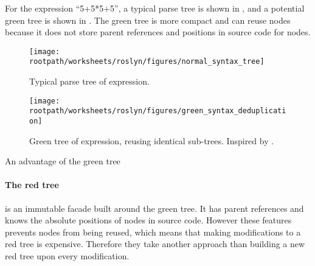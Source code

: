 For the expression ``5+5*5+5'', a typical parse tree is shown in , and a potential green tree is shown in . The green tree is more compact and can reuse nodes because it does not store parent references and positions in source code for nodes.

\begin{figure}[htbp]
\centering
 \texttt{[image: \\rootpath/worksheets/roslyn/figures/normal\_syntax\_tree]} 
 \caption{Typical parse tree of expression.}
\label{fig:normal_syntax_tree}
\end{figure}

\begin{figure}[htbp]
\centering
 \texttt{[image: \\rootpath/worksheets/roslyn/figures/green\_syntax\_deduplication]} 
 \caption{Green tree of expression, reusing identical sub-trees. Inspired by \cite{sadovRoslynPerf}.}
\label{fig:green_syntax_deduplication}
\end{figure}




An advantage of the green tree 






\paragraph{The red tree} is an immutable facade built around the green tree. It has parent references and knows the absolute positions of nodes in source code. However these features prevents nodes from being reused, which means that making modifications to a red tree is expensive. Therefore they take another approach than building a new red tree upon every modification\cite{lippert2012redgreen}. 

